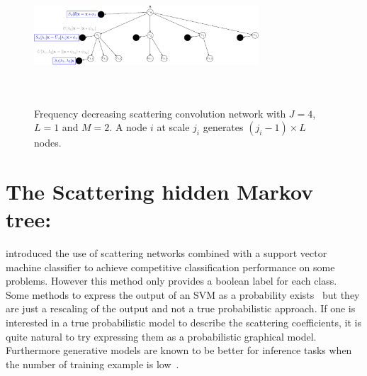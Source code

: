 \documentclass{article}
\begin{document}
  \begin{figure}[h]
    \begin{center}
      \includegraphics[width=3.3in, height=2in, keepaspectratio]{ST_freqDec_crop.pdf}
      \caption[Frequency decreasing scattering convolution network.]{\centering  Frequency decreasing scattering convolution network 	with $J=4$, $L=1$ and $M=2$. A node $i$ at scale $j_{i}$ generates $(j_{i}-1) \times L$ nodes. }
      \label{fig:SCN 2}
    \end{center}	
  \end{figure}



\section{The Scattering hidden Markov tree:}
\label{sec:SCHMT}

  \cite{Mallat ST} introduced the use of scattering networks combined with a support vector machine classifier to achieve competitive classification performance on some problems. However this method only provides a boolean label for each class. Some methods to express the output of an SVM as a probability exists~\cite{platt1999probabilistic} but they are just a rescaling of the output and not a true probabilistic approach. If one is interested in a true probabilistic model to describe the scattering coefficients, it is quite natural to try expressing them as a probabilistic graphical model. Furthermore generative models are known to be better for inference tasks when the number of training example is low~\cite{jordan2002discriminative}.\\
  
\end{document}
